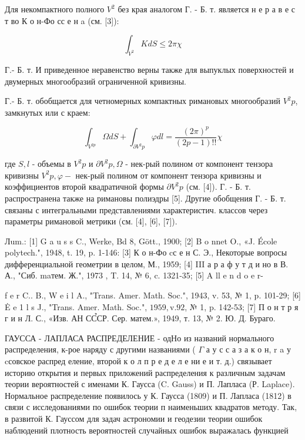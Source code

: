 \documentclass[10pt]{article}
\begin{document}
Для некомпактного полного $V^{2}$ без края аналогом Г. - Б. т. является н е р а в е с т во К о н-Фо сс е н a (см. [3]):



\[

\int_{V^{2}} K d S \leqslant 2 \pi \chi

\]



Г.- Б. т. И приведенное неравенство верны также для выпуклых поверхностей и двумерных многообразий ограниченной кривизны.



Г.- Б. т. обобщается для четномерных компактных римановых многообразий $V^{2} p$, замкнутых или с краем:



\[

\int_{V^{2 p}} \Omega d S+\int_{\partial V^{2} p} \varphi d l=\frac{(2 \pi)^{p}}{(2 p-1) ! !} \chi

\]



где $S, l$ - объемы в $V^{2} p$ и $\partial V^{2} p, \Omega$ - нек-рый полином от компонент тензора кривизны $V^{2} p, \varphi-$ нек-рый полином от компонент тензора кривизны и коэффициентов второй квадратичной формы $\partial V^{2} p$ (см. [4]). Г. - Б. т. распространена также на римановы полиэдры [5]. Другие обобщения Г. - Б. т. связаны с интегральными представлениями характеристич. классов через параметры римановой метрики (см. [4], [6], [7]).



Лum.: [1] G a u s s C., Werke, Bd 8, Gött., 1900; [2] B o nnet O., «J. École polytech.", 1948, t. 19, p. 1-146: [3] К о н-Фо cс е н С. Э., Некоторые вопросы дифференциальной геометрии в целом, М., 1959; [4] III а р а ф у т д и но в В. А., "Сиб. maтем. Ж.", 1973 , T. 14, № 6, c. 1321-35; [5] A ll e n d o e r-

f e r C.. B., W e i l A., "Trans. Amer. Math. Soc.", 1943, v. 53, № 1, p. 101-29; [6] Ė e 1 l s J., "Trans. Amer. Math. Soc.", $1959, \mathrm{v} .92$, № 1, p. 142-53; [7] П о н т р я г и н Л. С., «Изв. АН СС̉СР. Сер. матем.», 1949, т. 13, № 2. Ю. Д. Бураго.



ГАУССА - ЛАПЛАСА РАСПРЕДЕЛЕНИЕ - одНо из названий нормального распределения, к-рое наряду с другими названиями ( $\Gamma$ а у с с а з а к о н, $\mathrm{r}$ a у cсовское распред еление, второй к о л п р е д е л е ни е и т. д.) связывает историю открытия и первых приложений распределения к различным задачам теории вероятностей с именами К. Гаусса (C. Gauss) и П. Лапласа (Р. Laplace). Нормальное распределение появилось у К. Гаусса (1809) и П. Лапласа (1812) в связи с исследованиями по ошибок теории п наименьших квадратов методу. Так, в развитой $К$. Гауссом для задач астрономии и геодезии теории ошибок наблюдений плотность вероятностей случайных ошибок выражалась функцией
\end{document}
